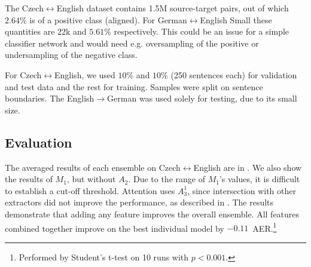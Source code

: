 The Czech$\leftrightarrow$English dataset contains 1.5M source-target pairs, out of which $2.64\%$ is of a positive class (aligned). For German$\leftrightarrow$English Small these quantities are 22k and $5.61\%$ respectively. This could be an issue for a simple classifier network and would need e.g. oversampling of the positive or undersampling of the negative class.

For Czech$\leftrightarrow$English, we used $10\%$ and $10\%$ (250 sentences each) for validation and test data and the rest for training. Samples were split on sentence boundaries. The English$\rightarrow$German was used solely for testing, due to its small size.

\subsection{Evaluation}

The averaged results of each ensemble on Czech$\leftrightarrow$English are in . We also show the results of $M_1$, but without $A_2$. Due to the range of $M_1$'s values, it is difficult to establish a cut-off threshold. Attention uses $A_3^1$, since intersection with other extractors did not improve the performance, as described in .
The results demonstrate that adding any feature improves the overall ensemble. All features combined together improve on the best individual model by $-0.11$\, AER.\footnote{Performed by Student's t-test on 10 runs with $p<0.001$.}

